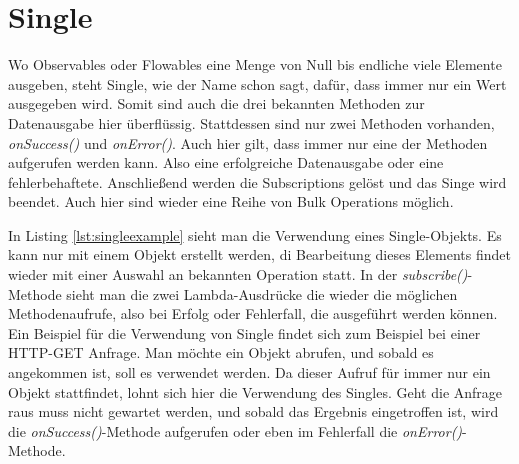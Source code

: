 \section{Single}
Wo Observables oder Flowables eine Menge von Null bis endliche viele Elemente ausgeben, steht Single, wie der Name schon sagt, dafür, dass immer nur ein Wert ausgegeben wird. Somit sind auch die drei bekannten Methoden zur Datenausgabe hier überflüssig. Stattdessen sind nur zwei Methoden vorhanden, \textit{onSuccess()} und \textit{onError()}. Auch hier gilt, dass immer nur eine der Methoden aufgerufen werden kann. Also eine erfolgreiche Datenausgabe oder eine fehlerbehaftete. Anschließend werden die Subscriptions gelöst und das Singe wird beendet. Auch hier sind wieder eine Reihe von Bulk Operations möglich. 

In Listing \ref{lst:singleexample} sieht man die Verwendung eines Single-Objekts. Es kann nur mit einem Objekt erstellt werden, di Bearbeitung dieses Elements findet wieder mit einer Auswahl an bekannten Operation statt. In der \textit{subscribe()}-Methode sieht man die zwei Lambda-Ausdrücke die wieder die möglichen Methodenaufrufe, also bei Erfolg oder Fehlerfall, die ausgeführt werden können. Ein Beispiel für die Verwendung von Single findet sich zum Beispiel bei einer HTTP-GET Anfrage. Man möchte ein Objekt abrufen, und sobald es angekommen ist, soll es verwendet werden. Da dieser Aufruf für immer nur ein Objekt stattfindet, lohnt sich hier die Verwendung des Singles. Geht die Anfrage raus muss nicht gewartet werden, und sobald das Ergebnis eingetroffen ist, wird die \textit{onSuccess()}-Methode aufgerufen oder eben im Fehlerfall die \textit{onError()}-Methode. 
